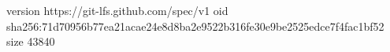 version https://git-lfs.github.com/spec/v1
oid sha256:71d70956b77ea21acae24e8d8ba2e9522b316fe30e9be2525edce7f4fac1bf52
size 43840
